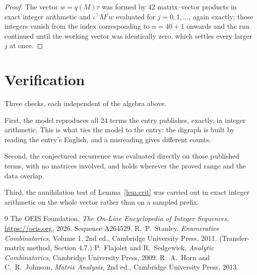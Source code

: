 \documentclass[11pt,a4paper]{article}
\theoremstyle{plain}
\theoremstyle{definition}
\begin{document}
\begin{proof}
The vector $w=q(M)\tau$ was formed by $42$ matrix--vector products in exact integer
arithmetic and $\iota^{\!\top}M^{j}w$ evaluated for $j=0,1,\dots$, again exactly; those
integers vanish from the index corresponding to $n=40+1$ onwards and the run continued
until the working vector was identically zero, which settles every larger $j$ at once.
\end{proof}

\section{Verification}

Three checks, each independent of the algebra above.

First, the model reproduces all $24$ terms the entry publishes, exactly, in integer
arithmetic. This is what ties the model to the entry: the digraph is built by reading the
entry's English, and a misreading gives different counts.

Second, the conjectured recurrence was evaluated directly on those published terms, with no
matrices involved, and holds wherever the proved range and the data overlap.

Third, the annihilation test of Lemma~\ref{lem:crit} was carried out in exact integer
arithmetic on the whole vector rather than on a sampled prefix.

\begin{thebibliography}{9}
 The OEIS Foundation, \emph{The On-Line Encyclopedia of Integer
Sequences}, \url{https://oeis.org}, 2026. Sequence A264529.
 R.~P.~Stanley, \emph{Enumerative Combinatorics}, Volume 1, 2nd ed.,
Cambridge University Press, 2011. (Transfer-matrix method, Section 4.7.)
 P.~Flajolet and R.~Sedgewick, \emph{Analytic Combinatorics}, Cambridge
University Press, 2009.
 R.~A.~Horn and C.~R.~Johnson, \emph{Matrix Analysis}, 2nd ed., Cambridge
University Press, 2013.
\end{thebibliography}
\end{document}
